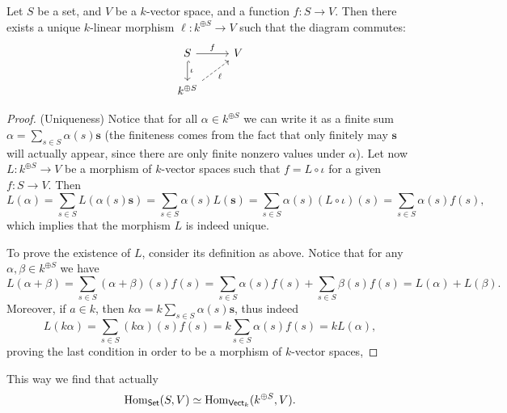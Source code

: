 \begin{proposition}
  \label{prop: universal property free vs}
  Let \(S\) be a set, and \(V\) be a \(k\)-vector space, and a function \(f : S
  \to V\). Then there exists a unique \(k\)-linear morphism \(\ell : k^{\oplus
  S} \to V\) such that the diagram commutes:
   \[
     \begin{tikzcd}
       S \ar[r, "f"] \ar[d, hook, "\iota"] &V \\
       k^{\oplus S} \ar[ru, dashed, swap, "\ell"]
     \end{tikzcd}
   \]
\end{proposition}

\begin{proof}
   (Uniqueness) Notice that for all \(\alpha \in k^{\oplus S}\) we can write it
   as a finite sum \(\alpha = \sum_{s \in S}\alpha(s) \mathbf s\) (the
   finiteness comes from the fact that only finitely may \(\mathbf s\) will
   actually appear, since there are only finite nonzero values under
   \(\alpha\)). Let now  \(L : k^{\oplus S} \to V\) be a morphism of
   \(k\)-vector spaces such that \(f = L \circ \iota\) for a given \(f : S \to
   V\). Then
   \[
      L(\alpha) = \sum_{s \in S} L(\alpha(s) \mathbf{s}) = \sum_{s \in S}
      \alpha(s) L(\mathbf s) = \sum_{s \in S} \alpha(s) (L \circ \iota)(s)
      = \sum_{s \in S} \alpha(s) f(s),
   \]
   which implies that the morphism \(L\) is indeed unique.

   To prove the existence of \(L\), consider its definition as above. Notice
   that for any \(\alpha, \beta \in k^{\oplus S}\) we have
   \[
      L(\alpha + \beta) = \sum_{s \in S} (\alpha + \beta)(s) f(s) = \sum_{s \in
      S} \alpha(s)f(s) + \sum_{s \in S} \beta(s)f(s) = L(\alpha) + L(\beta).
   \]
   Moreover, if \(a \in k\), then \(k \alpha = k\sum_{s \in S} \alpha(s)
   \mathbf s\), thus indeed
   \[
      L(k \alpha) = \sum_{s \in S} (k \alpha)(s) f(s) = k \sum_{s \in S}
      \alpha(s) f(s) = k L(\alpha),
   \]
   proving the last condition in order to be a morphism of \(k\)-vector spaces,
\end{proof}

This way we find that actually
\[
   \operatorname{Hom}_{\mathsf{Set}}(S, V) \simeq \operatorname{Hom}_{\mathsf{Vect}_k}(k^{\oplus S}, V).
\]

